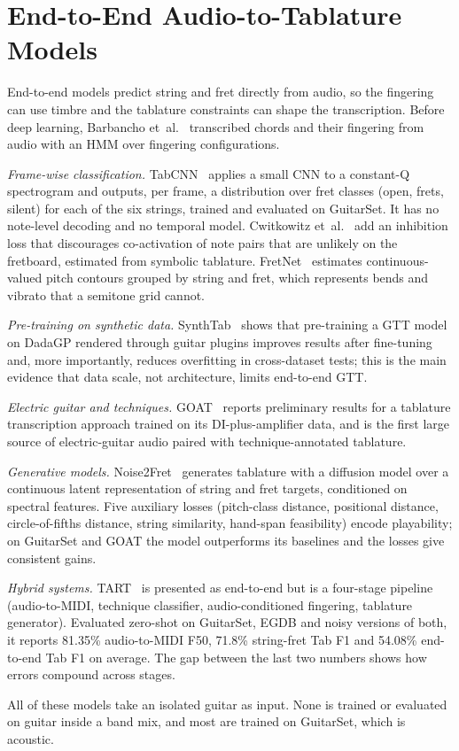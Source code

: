 \section{End-to-End Audio-to-Tablature Models}
\label{sec:e2e}

End-to-end models predict string and fret directly from audio, so the
fingering can use timbre and the tablature constraints can shape the
transcription. Before deep learning, Barbancho et~al.~\cite{barbancho2012chords}
transcribed chords and their fingering from audio with an HMM over
fingering configurations.

\emph{Frame-wise classification.} TabCNN~\cite{wiggins2019tabcnn} applies a
small CNN to a constant-Q spectrogram and outputs, per frame, a distribution
over fret classes (open, frets, silent) for each of the six strings, trained
and evaluated on GuitarSet. It has no note-level decoding and no temporal
model. Cwitkowitz et~al.~\cite{cwitkowitz2022inhibition} add an inhibition loss
that discourages co-activation of note pairs that are unlikely on the
fretboard, estimated from symbolic tablature. FretNet~\cite{cwitkowitz2023fretnet}
estimates continuous-valued pitch contours grouped by string and fret, which
represents bends and vibrato that a semitone grid cannot.

\emph{Pre-training on synthetic data.} SynthTab~\cite{zang2024synthtab} shows
that pre-training a GTT model on DadaGP rendered through guitar plugins
improves results after fine-tuning and, more importantly, reduces overfitting
in cross-dataset tests; this is the main evidence that data scale, not
architecture, limits end-to-end GTT.

\emph{Electric guitar and techniques.} GOAT~\cite{loth2025goat} reports
preliminary results for a tablature transcription approach trained on its
DI-plus-amplifier data, and is the first large source of electric-guitar audio
paired with technique-annotated tablature.

\emph{Generative models.} Noise2Fret~\cite{simionato2026noise2fret} generates
tablature with a diffusion model over a continuous latent representation of
string and fret targets, conditioned on spectral features. Five auxiliary
losses (pitch-class distance, positional distance, circle-of-fifths distance,
string similarity, hand-span feasibility) encode playability; on GuitarSet and
GOAT the model outperforms its baselines and the losses give consistent gains.

\emph{Hybrid systems.} TART~\cite{gupta2025tart,gupta2026tart} is presented
as end-to-end but is a four-stage pipeline (audio-to-MIDI, technique
classifier, audio-conditioned fingering, tablature generator). Evaluated
zero-shot on GuitarSet, EGDB and noisy versions of both, it reports 81.35\%
audio-to-MIDI F50, 71.8\% string-fret Tab F1 and 54.08\% end-to-end Tab F1
on average. The gap between the last two numbers shows how errors compound
across stages.

All of these models take an isolated guitar as input. None is trained or
evaluated on guitar inside a band mix, and most are trained on GuitarSet,
which is acoustic.
